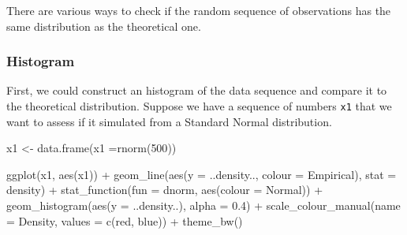 \documentclass[
]{book}
\newenvironment{Shaded}{\begin{snugshade}}{\end{snugshade}}
\newcommand{\AttributeTok}[1]{\textcolor[rgb]{0.77,0.63,0.00}{#1}}
\newcommand{\DecValTok}[1]{\textcolor[rgb]{0.00,0.00,0.81}{#1}}
\newcommand{\FloatTok}[1]{\textcolor[rgb]{0.00,0.00,0.81}{#1}}
\newcommand{\FunctionTok}[1]{\textcolor[rgb]{0.00,0.00,0.00}{#1}}
\newcommand{\NormalTok}[1]{#1}
\newcommand{\OtherTok}[1]{\textcolor[rgb]{0.56,0.35,0.01}{#1}}
\newcommand{\SpecialCharTok}[1]{\textcolor[rgb]{0.00,0.00,0.00}{#1}}
\newcommand{\StringTok}[1]{\textcolor[rgb]{0.31,0.60,0.02}{#1}}
\begin{document}
There are various ways to check if the random sequence of observations has the same distribution as the theoretical one.

\hypertarget{histogram}{%
\subsubsection{Histogram}\label{histogram}}

First, we could construct an histogram of the data sequence and compare it to the theoretical distribution. Suppose we have a sequence of numbers \texttt{x1} that we want to assess if it simulated from a Standard Normal distribution.

\begin{Shaded}
\begin{Highlighting}[]
\NormalTok{x1 }\OtherTok{\textless{}{-}} \FunctionTok{data.frame}\NormalTok{(}\AttributeTok{x1 =}\FunctionTok{rnorm}\NormalTok{(}\DecValTok{500}\NormalTok{))}
\end{Highlighting}
\end{Shaded}

\begin{Shaded}
\begin{Highlighting}[]
\FunctionTok{ggplot}\NormalTok{(x1, }\FunctionTok{aes}\NormalTok{(x1)) }\SpecialCharTok{+}
   \FunctionTok{geom\_line}\NormalTok{(}\FunctionTok{aes}\NormalTok{(}\AttributeTok{y =}\NormalTok{ ..density.., }\AttributeTok{colour =} \StringTok{\textquotesingle{}Empirical\textquotesingle{}}\NormalTok{), }\AttributeTok{stat =} \StringTok{\textquotesingle{}density\textquotesingle{}}\NormalTok{) }\SpecialCharTok{+}
   \FunctionTok{stat\_function}\NormalTok{(}\AttributeTok{fun =}\NormalTok{ dnorm, }\FunctionTok{aes}\NormalTok{(}\AttributeTok{colour =} \StringTok{\textquotesingle{}Normal\textquotesingle{}}\NormalTok{)) }\SpecialCharTok{+}      
   \FunctionTok{geom\_histogram}\NormalTok{(}\FunctionTok{aes}\NormalTok{(}\AttributeTok{y =}\NormalTok{ ..density..), }\AttributeTok{alpha =} \FloatTok{0.4}\NormalTok{) }\SpecialCharTok{+}      
   \FunctionTok{scale\_colour\_manual}\NormalTok{(}\AttributeTok{name =} \StringTok{\textquotesingle{}Density\textquotesingle{}}\NormalTok{, }\AttributeTok{values =} \FunctionTok{c}\NormalTok{(}\StringTok{\textquotesingle{}red\textquotesingle{}}\NormalTok{, }\StringTok{\textquotesingle{}blue\textquotesingle{}}\NormalTok{)) }\SpecialCharTok{+}
   \FunctionTok{theme\_bw}\NormalTok{()}
\end{Highlighting}
\end{Shaded}
\end{document}
